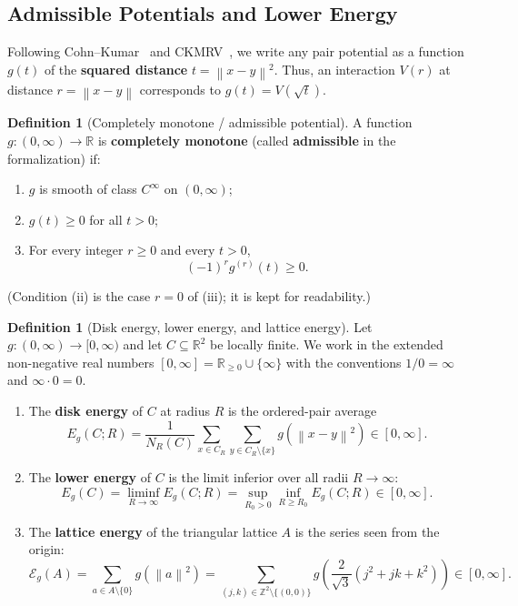 \documentclass[11pt, a4paper]{article}
\theoremstyle{definition}
\newtheorem{definition}[theorem]{Definition}
\theoremstyle{remark}
\newcommand{\R}{\mathbb{R}}
\newcommand{\Z}{\mathbb{Z}}
\newcommand{\Ecal}{\mathcal{E}}
\newcommand{\norm}[1]{\left\lVert #1 \right\rVert}
\begin{document}
\subsection{Admissible Potentials and Lower Energy}

Following Cohn--Kumar~\cite{CK07} and CKMRV~\cite{CKMRV22}, we write any pair potential as a function $g(t)$ of the \textbf{squared distance} $t = \norm{x - y}^2$. Thus, an interaction $V(r)$ at distance $r = \norm{x - y}$ corresponds to $g(t) = V(\sqrt{t})$.

\begin{definition}[Completely monotone / admissible potential]
\label{def:admissible}
A function $g : (0, \infty) \to \R$ is \textbf{completely monotone} (called \textbf{admissible} in the formalization) if:
\begin{enumerate}[label=(\roman*)]
    \item $g$ is smooth of class $C^\infty$ on $(0, \infty)$;
    \item $g(t) \ge 0$ for all $t > 0$;
    \item For every integer $r \ge 0$ and every $t > 0$,
    \[
    (-1)^r g^{(r)}(t) \ge 0.
    \]
\end{enumerate}
(Condition (ii) is the case $r = 0$ of (iii); it is kept for readability.)
\end{definition}

\begin{definition}[Disk energy, lower energy, and lattice energy]
\label{def:energies}
Let $g : (0, \infty) \to [0, \infty)$ and let $C \subseteq \R^2$ be locally finite. We work in the extended non-negative real numbers $[0, \infty] = \R_{\ge 0} \cup \{\infty\}$ with the conventions $1/0 = \infty$ and $\infty \cdot 0 = 0$.
\begin{enumerate}[label=(\roman*)]
    \item The \textbf{disk energy} of $C$ at radius $R$ is the ordered-pair average
    \begin{equation}
    \label{eq:disk_energy}
    E_g(C; R) = \frac{1}{N_R(C)} \sum_{x \in C_R} \sum_{y \in C_R \setminus \{x\}} g\left(\norm{x - y}^2\right) \in [0, \infty].
    \end{equation}
    \item The \textbf{lower energy} of $C$ is the limit inferior over all radii $R \to \infty$:
    \begin{equation}
    \label{eq:lower_energy}
    E_g(C) = \liminf_{R \to \infty} E_g(C; R) = \sup_{R_0 > 0} \inf_{R \ge R_0} E_g(C; R) \in [0, \infty].
    \end{equation}
    \item The \textbf{lattice energy} of the triangular lattice $A$ is the series seen from the origin:
    \begin{equation}
    \label{eq:lattice_energy}
    \Ecal_g(A) = \sum_{a \in A \setminus \{0\}} g\left(\norm{a}^2\right) = \sum_{(j, k) \in \Z^2 \setminus \{(0,0)\}} g\left(\frac{2}{\sqrt{3}}(j^2 + j k + k^2)\right) \in [0, \infty].
    \end{equation}
\end{enumerate}
\end{definition}
\end{document}
